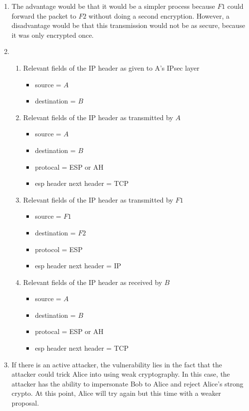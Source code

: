 \documentclass[11pt]{article}
\begin{document}
\begin{enumerate}
\item 

The advantage would be that it would be a simpler process because $F1$ could forward the packet to $F2$ without doing a second encryption.  However, a disadvantage would be that this transmission would not be as secure, because it was only encrypted once.  

\item 

\begin{enumerate}
\item Relevant fields of the IP header as given to A's IPsec layer
\begin{itemize}
\item source = $A$
\item destination = $B$
\end{itemize}
\item Relevant fields of the IP header as transmitted by $A$
\begin{itemize}
\item source  = $A$
\item destination = $B$
\item protocal = ESP or AH
\item esp header next header = TCP
\end{itemize}
\item Relevant fields of the IP header as transmitted by $F1$
\begin{itemize}
\item source = $F1$
\item destination = $F2$
\item protocol = ESP
\item esp header next header = IP
\end{itemize}
\item Relevant fields of the IP header as received by $B$
\begin{itemize}
\item source  = $A$
\item destination = $B$
\item protocal = ESP or AH
\item esp header next header = TCP
\end{itemize}
\end{enumerate}

\item 

If there is an active attacker, the vulnerability lies in the fact that the attacker could trick Alice into using weak cryptography.  In this case, the attacker has the ability to impersonate Bob to Alice and reject Alice's strong crypto.  At this point, Alice will try again but this time with a weaker proposal.  


\end{enumerate}
\end{document}
